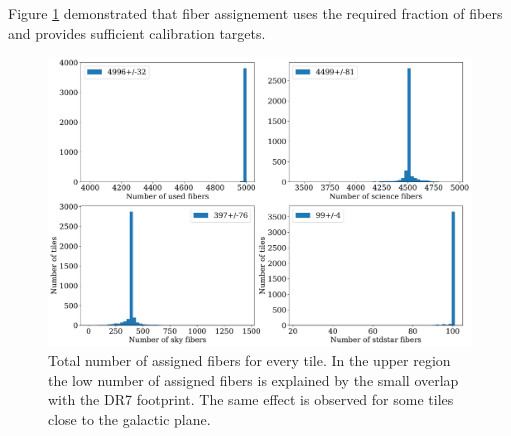 \documentclass{article}
\begin{document}
Figure \ref{fig:used_fibers} demonstrated that fiber assignement uses
the required fraction of fibers and provides sufficient calibration
targets. 


\begin{figure}[!h]
\begin{center}
\begin{center}
\includegraphics[scale=0.35]{used_fibers.pdf}
\end{center}
\caption{Total number of assigned fibers for every tile. In the upper
  region the low number of assigned fibers is explained by the small
  overlap with the DR7 footprint.  The same effect is observed for
  some tiles close to the galactic plane.
\label{fig:used_fibers}}
\end{center}
\end{figure}
\end{document}
